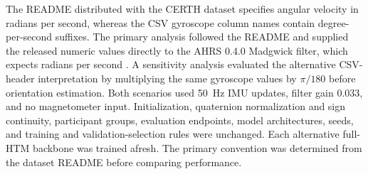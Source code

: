 The README distributed with the CERTH dataset \cite{ref12} specifies
angular velocity in radians per second, whereas the CSV gyroscope
column names contain degree-per-second suffixes. The primary analysis
followed the README and supplied the released numeric values directly
to the AHRS 0.4.0 Madgwick filter, which expects radians per second
\cite{ref13}. A sensitivity analysis evaluated the alternative CSV-header
interpretation by multiplying the same gyroscope values by $\pi/180$
before orientation estimation. Both scenarios used 50~Hz IMU updates,
filter gain $0.033$, and no magnetometer input. Initialization,
quaternion normalization and sign continuity, participant groups,
evaluation endpoints, model architectures, seeds, and training and
validation-selection rules were unchanged. Each alternative full-HTM
backbone was trained afresh. The primary convention was determined
from the dataset README before comparing performance.
